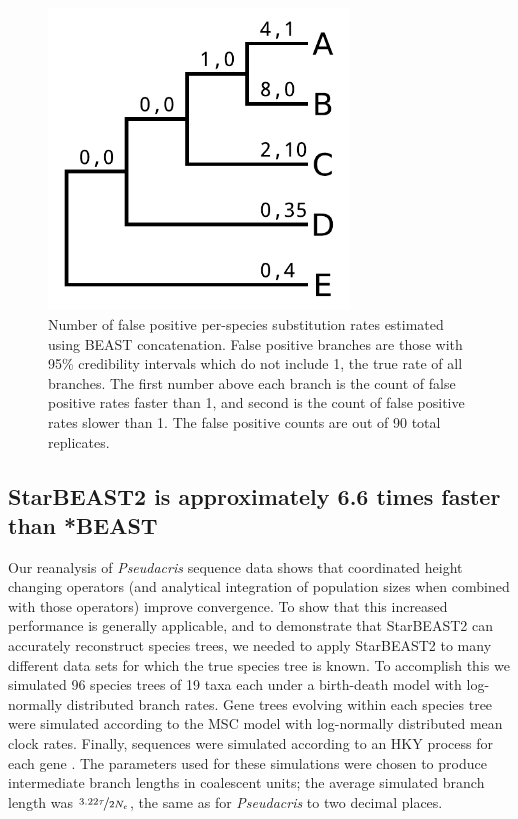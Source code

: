 \documentclass[12pt]{article}
\begin{document}
\begin{figure}[htb!]
\centering
\includegraphics[width=8cm]{false_positives.pdf}
\caption
{Number of false positive per-species substitution rates estimated using BEAST concatenation. False positive
branches are those with 95\% credibility intervals which do not include 1, the
true rate of all branches. The first number above each branch is the count of
false positive rates faster than 1, and second is the count of false positive
rates slower than 1. The false positive counts are out of 90 total replicates.}
\label{fig:spilsFalsePositives}
\end{figure}

\subsection{StarBEAST2 is approximately 6.6 times faster than *BEAST}

Our reanalysis of \textit{Pseudacris} sequence data shows that coordinated height changing operators
(and analytical integration of population sizes when combined with those operators)
improve convergence. To show that this increased performance is generally
applicable, and to demonstrate that StarBEAST2 can accurately reconstruct
species trees, we needed to apply StarBEAST2 to many different data sets for
which the true species tree is known. To accomplish this we simulated 96 species
trees of 19 taxa each under a birth-death model with log-normally distributed
branch rates. Gene trees evolving within each species tree were simulated
according to the MSC model with log-normally distributed mean clock rates.
Finally, sequences were simulated according to an HKY process for each gene
\citep{Hasegawa1985, Goldman1993}. The parameters used for these simulations
were chosen to produce intermediate branch lengths in coalescent units; the
average simulated branch length was $\nicefrac{3.22\tau}{2N_e}$, the same as for
\textit{Pseudacris} to two decimal places.
\end{document}
